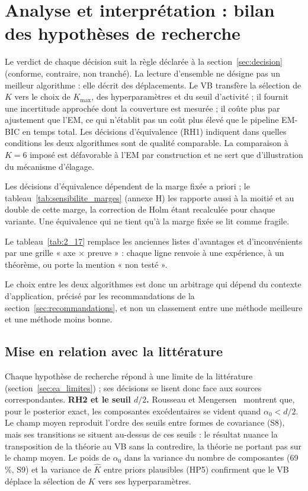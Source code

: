 \section{Analyse et interprétation : bilan des hypothèses de recherche}\label{sec:bilan}

Le verdict de chaque décision suit la règle déclarée à la section~\ref{sec:decision} (conforme, contraire, non tranché). La lecture d'ensemble ne désigne pas un meilleur algorithme : elle décrit des déplacements. Le VB transfère la sélection de $K$ vers le choix de $K_{\max}$, des hyperparamètres et du seuil d'activité ; il fournit une incertitude approchée dont la couverture est mesurée ; il coûte plus par ajustement que l'EM, ce qui n'établit pas un coût plus élevé que le pipeline EM-BIC en temps total. Les décisions d'équivalence (RH1) indiquent dans quelles conditions les deux algorithmes sont de qualité comparable. La comparaison à $K = 6$ imposé est défavorable à l'EM par construction et ne sert que d'illustration du mécanisme d'élagage.

Les décisions d'équivalence dépendent de la marge fixée a priori ; le tableau~\ref{tab:sensibilite_marges} (annexe H) les rapporte aussi à la moitié et au double de cette marge, la correction de Holm étant recalculée pour chaque variante. Une équivalence qui ne tient qu'à la marge fixée se lit comme fragile.


Le tableau~\ref{tab:2_17} remplace les anciennes listes d'avantages et d'inconvénients par une grille « axe $\times$ preuve » : chaque ligne renvoie à une expérience, à un théorème, ou porte la mention « non testé ».

Le choix entre les deux algorithmes est donc un arbitrage qui dépend du contexte d'application, précisé par les recommandations de la section~\ref{sec:recommandations}, et non un classement entre une méthode meilleure et une méthode moins bonne.

\subsection{Mise en relation avec la littérature}\label{sec:res_litterature}
Chaque hypothèse de recherche répond à une limite de la littérature (section~\ref{sec:ea_limites}) ; ses décisions se lisent donc face aux sources correspondantes.
\textbf{RH2 et le seuil $d/2$.} Rousseau et Mengersen~\cite{rousseau2011} montrent que, pour le posterior exact, les composantes excédentaires se vident quand $\alpha_0 < d/2$. Le champ moyen reproduit l'ordre des seuils entre formes de covariance (S8), mais ses transitions se situent au-dessus de ces seuils : le résultat nuance la transposition de la théorie au VB sans la contredire, la théorie ne portant pas sur le champ moyen. Le poids de $\alpha_0$ dans la variance du nombre de composantes (69 \%, S9) et la variance de $\hat K$ entre priors plausibles (HP5) confirment que le VB déplace la sélection de $K$ vers ses hyperparamètres.

